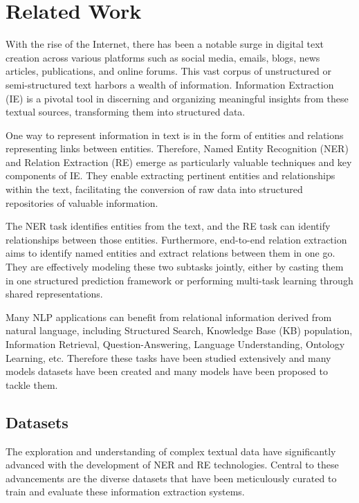 \chapter{Related Work}
\label{chp:relatedWork}

With the rise of the Internet, there has been a notable surge in digital text creation across various platforms such as social media, emails, blogs, news articles, publications, and online forums. This vast corpus of unstructured or semi-structured text harbors a wealth of information. Information Extraction (IE) is a pivotal tool in discerning and organizing meaningful insights from these textual sources, transforming them into structured data.

One way to represent information in text is in the form of entities and relations representing links between entities. Therefore, Named Entity Recognition (NER) and Relation Extraction (RE) emerge as particularly valuable techniques and key components of IE. They enable extracting pertinent entities and relationships within the text, facilitating the conversion of raw data into structured repositories of valuable information.

The NER task identifies entities from the text, and the RE task can identify relationships between those entities. Furthermore, end-to-end relation extraction aims to identify named entities and extract relations between them in one go. They are effectively modeling these two subtasks jointly\cite{Zhong2020AFE}, either by casting them in one structured prediction framework or performing multi-task learning through shared representations.

Many NLP applications can benefit from relational information derived from natural language\cite{Goyal2018RNE}, including Structured Search, Knowledge Base (KB) population, Information Retrieval, Question-Answering, Language Understanding, Ontology Learning, etc. Therefore these tasks have been studied extensively and many models datasets have been created and many models have been proposed to tackle them.

\section{Datasets}
The exploration and understanding of complex textual data have significantly advanced with the development of NER and RE technologies. Central to these advancements are the diverse datasets that have been meticulously curated to train and evaluate these information extraction systems.

